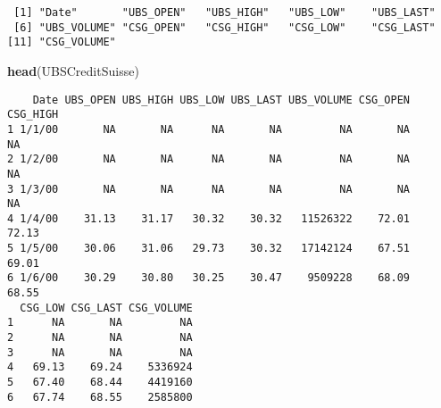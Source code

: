 \documentclass[]{book}
\newenvironment{Shaded}{\begin{snugshade}}{\end{snugshade}}
\newcommand{\KeywordTok}[1]{\textcolor[rgb]{0.13,0.29,0.53}{\textbf{#1}}}
\newcommand{\DataTypeTok}[1]{\textcolor[rgb]{0.13,0.29,0.53}{#1}}
\newcommand{\DecValTok}[1]{\textcolor[rgb]{0.00,0.00,0.81}{#1}}
\newcommand{\FloatTok}[1]{\textcolor[rgb]{0.00,0.00,0.81}{#1}}
\newcommand{\StringTok}[1]{\textcolor[rgb]{0.31,0.60,0.02}{#1}}
\newcommand{\CommentTok}[1]{\textcolor[rgb]{0.56,0.35,0.01}{\textit{#1}}}
\newcommand{\OperatorTok}[1]{\textcolor[rgb]{0.81,0.36,0.00}{\textbf{#1}}}
\newcommand{\NormalTok}[1]{#1}
\begin{document}
\begin{verbatim}
 [1] "Date"       "UBS_OPEN"   "UBS_HIGH"   "UBS_LOW"    "UBS_LAST"  
 [6] "UBS_VOLUME" "CSG_OPEN"   "CSG_HIGH"   "CSG_LOW"    "CSG_LAST"  
[11] "CSG_VOLUME"
\end{verbatim}

\begin{Shaded}
\begin{Highlighting}[]
\KeywordTok{head}\NormalTok{(UBSCreditSuisse)}
\end{Highlighting}
\end{Shaded}

\begin{verbatim}
    Date UBS_OPEN UBS_HIGH UBS_LOW UBS_LAST UBS_VOLUME CSG_OPEN CSG_HIGH
1 1/1/00       NA       NA      NA       NA         NA       NA       NA
2 1/2/00       NA       NA      NA       NA         NA       NA       NA
3 1/3/00       NA       NA      NA       NA         NA       NA       NA
4 1/4/00    31.13    31.17   30.32    30.32   11526322    72.01    72.13
5 1/5/00    30.06    31.06   29.73    30.32   17142124    67.51    69.01
6 1/6/00    30.29    30.80   30.25    30.47    9509228    68.09    68.55
  CSG_LOW CSG_LAST CSG_VOLUME
1      NA       NA         NA
2      NA       NA         NA
3      NA       NA         NA
4   69.13    69.24    5336924
5   67.40    68.44    4419160
6   67.74    68.55    2585800
\end{verbatim}

\begin{Shaded}
\end{Shaded}
\end{document}
